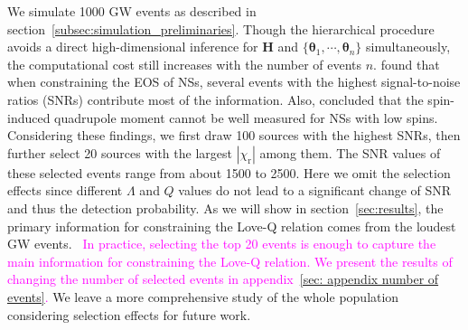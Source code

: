 \documentclass[a4paper,11pt]{article}
\newcommand{\Revise}[1]{\textcolor{magenta}{~#1}}
\begin{document}
We simulate 1000 GW events as described in
section~\ref{subsec:simulation_preliminaries}.  Though the hierarchical
procedure avoids a direct high-dimensional inference for $\bm{H}$ and
$\{\bm{\theta}_1,\cdots,\bm{\theta}_n\}$ simultaneously, the computational cost
still increases with the number of events $n$.  \citet{Lackey:2014fwa} found
that when constraining the EOS of NSs, several events with the highest
signal-to-noise ratios (SNRs) contribute most of the information. Also,
\citet{Yagi:2013awa} concluded that the spin-induced quadrupole moment cannot be
well measured for NSs with low spins. Considering these findings, we first draw
100 sources with the highest SNRs, then further select 20 sources with the
largest $|\chi_{\mathrm{r}}|$ among them. The SNR values of these selected events range from about 1500 to 2500.
Here we omit the selection effects 
since different $\Lambda$ and $Q$ values do not lead to a 
significant change of SNR and thus the detection probability. As we will show in
section~\ref{sec:results}, the primary information for constraining the Love-Q
relation comes from the loudest GW events. 
\Revise{In practice, selecting the top 20 events is enough to capture the main
information for constraining the Love-Q relation. We present the results of
changing the number of selected events in appendix~\ref{sec: appendix number of events}.}
We leave a more comprehensive study of the whole population considering selection effects for future work.
\end{document}
